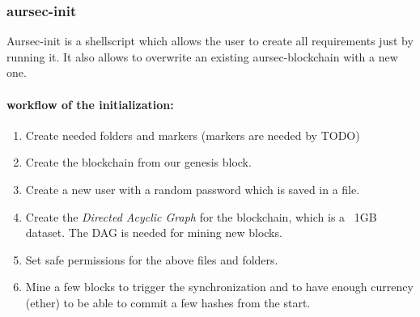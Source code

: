 \subsubsection{aursec-init}
Aursec-init is a shellscript which allows the user to create all requirements just by running it. It also allows to overwrite an existing aursec-blockchain with a new one.

\paragraph*{workflow of the initialization:}
\begin{enumerate}
	\item Create needed folders and markers (markers are needed by TODO)
	\item Create the blockchain from our genesis block.
	\item Create a new user with a random password which is saved in a file.
	\item Create the \emph{Directed Acyclic Graph} for the blockchain, which is a ~1GB dataset. The DAG is needed for mining new blocks. \cite{wiki:DAG}
	\item Set safe permissions for the above files and folders.
	\item Mine a few blocks to trigger the synchronization and to have enough currency (ether) to be able to commit a few hashes from the start.
\end{enumerate}

